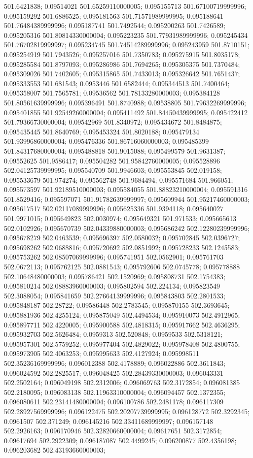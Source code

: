 501.6421838; 0.09514021 501.65259110000005; 0.095155713 501.67100719999996; 0.095159292 501.6886525; 0.095181563 501.71571989999995; 0.095188641 501.76484389999996; 0.095187741 501.7492544; 0.095200263 501.7426589; 0.095205316 501.80814330000004; 0.095223235 501.77931989999996; 0.095245434 501.76702819999997; 0.095234745 501.74514289999996; 0.095243959 501.8710151; 0.095254919 501.7943526; 0.095257016 501.7350783; 0.095275915 501.8035178; 0.095285584 501.8797093; 0.095286986 501.7694265; 0.095305375 501.7370484; 0.095309026 501.7402605; 0.095315865 501.7433013; 0.095326642 501.7651437; 0.095333553 501.681543; 0.0953446 501.6582444; 0.095344513 501.7400464; 0.095358007 501.7565781; 0.09536562 501.78133280000003; 0.095384128 501.80561639999996; 0.095396491 501.8740988; 0.09538805 501.79632269999996; 0.095401855 501.92549260000004; 0.095411492 501.84450439999995; 0.095422412 501.79366730000004; 0.09542969 501.8340972; 0.095434672 501.8484875; 0.095435445 501.8640769; 0.095453324 501.8020188; 0.095479134 501.93996860000004; 0.095476336 501.86716060000003; 0.095485399 501.84317680000004; 0.095488818 501.9015088; 0.095499579 501.9631387; 0.09552625 501.9586417; 0.095504282 501.95842760000005; 0.095528896 502.04125739999995; 0.095540709 501.9946603; 0.095553845 502.019158; 0.095533679 501.974274; 0.095562748 501.9684494; 0.095571684 501.966051; 0.095573597 501.92189510000003; 0.095584055 501.88823210000004; 0.095591316 501.8529416; 0.095597071 501.91782639999997; 0.095609944 501.95217460000003; 0.095617517 502.02117089999996; 0.095625336 501.9394118; 0.095640027 501.9971015; 0.095649823 502.0030974; 0.095649321 501.971533; 0.095665613 502.0102926; 0.095670739 502.04339880000003; 0.095686242 502.12280239999996; 0.095678279 502.0463539; 0.095696397 502.0580032; 0.095702845 502.0396727; 0.095698262 502.0688816; 0.095720692 502.0851992; 0.095728233 502.1245583; 0.095753262 502.08507069999996; 0.095741951 502.0562901; 0.095761703 502.0672113; 0.095762125 502.0881543; 0.095792606 502.0745778; 0.095778888 502.10648480000003; 0.095786421 502.1520969; 0.095808731 502.1754383; 0.095810214 502.08883960000003; 0.095802594 502.224134; 0.095823549 502.3088054; 0.095841659 502.27664139999996; 0.095843803 502.2801533; 0.095848187 502.28722; 0.09586448 502.2783545; 0.095870155 502.3693645; 0.095881936 502.4255124; 0.095875049 502.4494534; 0.095910073 502.4912965; 0.095897711 502.4220005; 0.095900588 502.4818315; 0.095917662 502.4636295; 0.095932703 502.5626484; 0.0959313 502.520848; 0.0959533 502.5318121; 0.095957301 502.5759252; 0.095977404 502.4829022; 0.095978408 502.4800755; 0.095973905 502.4063253; 0.095995633 502.4127924; 0.095998511 502.35236169999996; 0.096012388 502.4178889; 0.096022886 502.3611843; 0.096024592 502.2825517; 0.096048425 502.28439330000003; 0.096043331 502.2502164; 0.096049198 502.2312006; 0.096069763 502.3172854; 0.096081385 502.2180095; 0.096083138 502.11963310000004; 0.096094457 502.1372355; 0.096080611 502.23141480000004; 0.096100786 502.2481178; 0.096117309 502.28927569999996; 0.096122475 502.20207739999995; 0.096128772 502.3292345; 0.0961507 502.371249; 0.096145216 502.33411689999997; 0.096157148 502.2926163; 0.096170946 502.32820660000004; 0.09617651 502.3172854; 0.09617694 502.2922309; 0.096187087 502.4499245; 0.096200877 502.4356198; 0.096203682 502.43193660000003; 